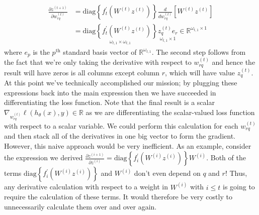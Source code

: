 \documentclass[12pt]{article}
\newcommand{\R}{\mathcal{R}}
\def\R{\mathbb{R}}
\begin{document}
\begin{align*}
\frac{\partial z^{(t + 1)}}{\partial w_{rq}^{(t)}} &= \text{diag}\left\{f_{t}^\prime(W^{(t)}z^{(t)})\right\} \frac{d}{dw_{rq}^{(t)}} \left[W^{(t)} z^{(t)} \right]\\
							          &= \underset{\omega_{t, 1} \times \omega_{t, 1}}{\text{diag}\left\{f_{t}^\prime(W^{(t)}z^{(t)})\right\}}  \underset{\omega_{t, 1} \times 1}{z_q^{(t)} e_r} \in \R^{\omega_{t, 1} \times 1}
\end{align*}
where $e_p$ is the $p^\text{th}$ standard basis vector of $\R^{\omega_{t, 1}}$. The second step follows from the fact that we're only taking the derivative with respect to $w_{rq}^{(t)}$ and hence the result will have zeros
is all columns except column $r$, which will have value $z_q^{(t)}$. At this point we've technically accomplished our mission; by plugging these expressions back into the main expression then we 
have succeeded in differentiating the loss function. Note that the final result is a scalar $\nabla_{w_{rq}^{(t)}} \ell(h_\theta(x), y) \in \R$ as we are differentiating the scalar-valued loss function with respect to 
a scalar variable. We could perform this calculation for each $w_{rq}^{(t)}$ and then stack all of the derivatives in one big vector to form the gradient. However, this naive approach would be very inefficient. As an 
example, consider the expression we derived $\frac{\partial z^{(i + 1)}}{\partial z^{(i)}} = \text{diag}\left\{f_{i}^\prime(W^{(i)}z^{(i)})\right\} W^{(i)}$. Both of the terms $\text{diag}\left\{f_{i}^\prime(W^{(i)}z^{(i)})\right\}$
and $W^{(i)}$ don't even depend on $q$ and $r$! Thus, any derivative calculation with respect to a weight in $W^{(i)}$ with $i \leq t$ is going to require the calculation of these terms. It would therefore be very 
costly to unnecessarily calculate them over and over again. 
\end{document}
